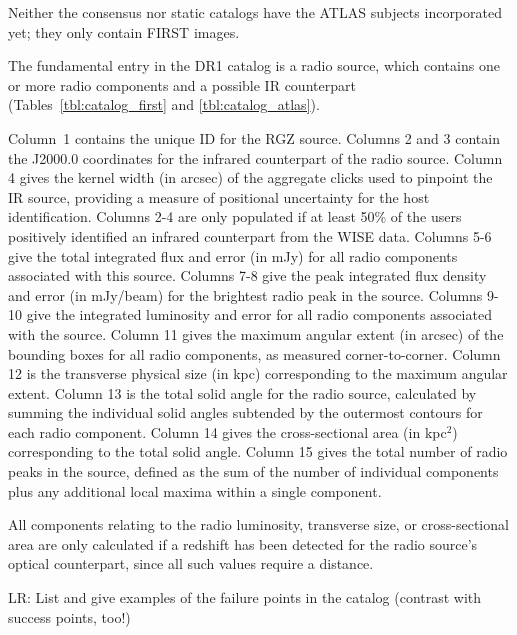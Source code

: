 \documentclass[a4,useAMS,usenatbib]{mn2e}
\begin{document}
Neither the consensus nor static catalogs have the ATLAS subjects incorporated yet; they only contain FIRST images.

The fundamental entry in the DR1 catalog is a radio source, which contains one or more radio components and a possible IR counterpart (Tables~\ref{tbl:catalog_first} and \ref{tbl:catalog_atlas}). 

Column~1 contains the unique ID for the RGZ source. Columns 2 and 3 contain the J2000.0 coordinates for the infrared counterpart of the radio source. Column 4 gives the kernel width (in arcsec) of the aggregate clicks used to pinpoint the IR source, providing a measure of positional uncertainty for the host identification. Columns 2-4 are only populated if at least 50\% of the users positively identified an infrared counterpart from the WISE data. Columns 5-6 give the total integrated flux and error (in mJy) for all radio components associated with this source. Columns 7-8 give the peak integrated flux density and error (in mJy/beam) for the brightest radio peak in the source. Columns 9-10 give the integrated luminosity and error for all radio components associated with the source. Column 11 gives the maximum angular extent (in arcsec) of the bounding boxes for all radio components, as measured corner-to-corner. Column 12 is the transverse physical size (in kpc) corresponding to the maximum angular extent. Column 13 is the total solid angle for the radio source, calculated by summing the individual solid angles subtended by the outermost contours for each radio component. Column 14 gives the cross-sectional area (in kpc$^2$) corresponding to the total solid angle. Column 15 gives the total number of radio peaks in the source, defined as the sum of the number of individual components plus any additional local maxima within a single component. 

All components relating to the radio luminosity, transverse size, or cross-sectional area are only calculated if a redshift has been detected for the radio source's optical counterpart, since all such values require a distance.

LR: List and give examples of the failure points in the catalog (contrast with success points, too!) 

\newpage
\end{document}

